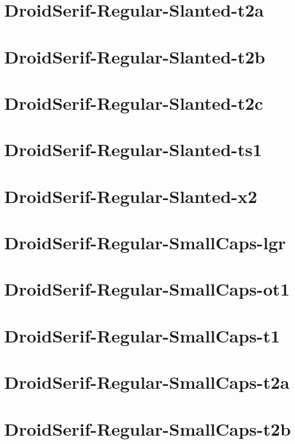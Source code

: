 \documentclass{article}
\begin{document}
\section{DroidSerif-Regular-Slanted-t2a}

\section{DroidSerif-Regular-Slanted-t2b}

\section{DroidSerif-Regular-Slanted-t2c}

\section{DroidSerif-Regular-Slanted-ts1}

\section{DroidSerif-Regular-Slanted-x2}

\section{DroidSerif-Regular-SmallCaps-lgr}

\section{DroidSerif-Regular-SmallCaps-ot1}

\section{DroidSerif-Regular-SmallCaps-t1}

\section{DroidSerif-Regular-SmallCaps-t2a}

\section{DroidSerif-Regular-SmallCaps-t2b}
\end{document}
